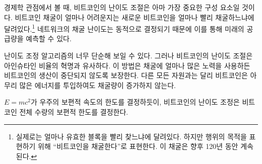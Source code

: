 \begin{comment}	
Viewed through the lens of economics, Bitcoin's \textit{difficulty adjustment}
is probably its most important component. How hard it is to mine bitcoin depends
on how quickly new bitcoins are mined.\footnote{It actually depends on how
quickly valid blocks are found, but for our purposes, this is the same thing as
\enquote{mining bitcoins} and will be so for the next 120 years.} It is the dynamic
adjustment of the network's mining difficulty which enables us to predict its
future supply.
\end{comment}
경제학 관점에서 볼 때, 비트코인의 난이도 조절은 아마 가장 중요한 구성 요소일 것이다.
비트코인 채굴이 얼마나 어려운지는 새로운 비트코인을 얼마나 빨리 채굴하느냐에 달려있다.\footnote{실제로는 얼마나 유효한 블록을 빨리 찾느냐에 달려있다. 
하지만 행위의 목적을 표현하기 위해 \enquote{비트코인을 채굴한다}로 표현한다. 
이 채굴은 향후 120년 동안 계속된다.}
네트워크의 채굴 난이도는 동적으로 결정되기 때문에 이를 통해 미래의 공급량을 예측할 수 있다.

\begin{comment}	
The simplicity of the difficulty adjustment algorithm might distract
from its profundity, but the difficulty adjustment truly is a revolution
of Einsteinian proportions. It ensures that, no matter how much or how
little effort is spent on mining, Bitcoin's controlled supply won't be
disrupted. As opposed to every other resource, no matter how much
energy someone will put into mining bitcoin, the total reward will not
increase.
\end{comment}
난이도 조정 알고리즘의 너무 단순해 보일 수 있다. 
그러나 비트코인의 난이도 조절은 아인슈타인 비율의 혁명과 유사하다.
이 방법은 채굴에 얼마나 많은 노력을 사용하든 비트코인의 생산이 중단되지 않도록 보장한다.
다른 모든 자원과는 달리 비트코인은 아무리 많은 에너지를 투입하여도 채굴량이 증가하지 않는다.

\begin{comment}	
Just like $E=mc^2$ dictates the universal speed limit in our universe,
Bitcoin's difficulty adjustment dictates the \textbf{universal money limit}
in Bitcoin.
\end{comment}
$E=mc^2$가 우주의 보편적 속도의 한도를 결정하듯이, 
비트코인의 난이도 조정은 비트코인 전체 수량의 보편적 한도를 결정한다.


